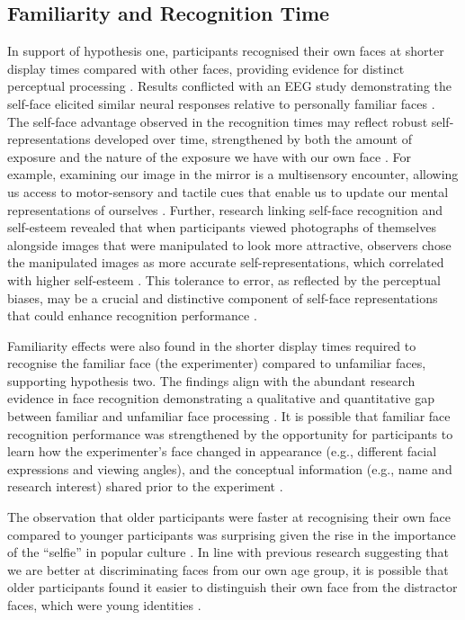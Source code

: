 \documentclass[
  authoryear,
  review,
  3p,
  onecolumn]{elsarticle}
\begin{document}
\subsection{Familiarity and Recognition
Time}\label{familiarity-and-recognition-time}

In support of hypothesis one, participants recognised their own faces at
shorter display times compared with other faces, providing evidence for
distinct perceptual processing \citep{alzueta2019a, rooney2012a}.
Results conflicted with an EEG study demonstrating the self-face
elicited similar neural responses relative to personally familiar faces
\citep{wiese2021a}. The self-face advantage observed in the recognition
times may reflect robust self-representations developed over time,
strengthened by both the amount of exposure and the nature of the
exposure we have with our own face \citep{bortolon2017a, tong1999a}. For
example, examining our image in the mirror is a multisensory encounter,
allowing us access to motor-sensory and tactile cues that enable us to
update our mental representations of ourselves \citep{bortolon2017a}.
Further, research linking self-face recognition and self-esteem revealed
that when participants viewed photographs of themselves alongside images
that were manipulated to look more attractive, observers chose the
manipulated images as more accurate self-representations, which
correlated with higher self-esteem \citep{felisberti2014a}. This
tolerance to error, as reflected by the perceptual biases, may be a
crucial and distinctive component of self-face representations that
could enhance recognition performance \citep{felisberti2014a}.

Familiarity effects were also found in the shorter display times
required to recognise the familiar face (the experimenter) compared to
unfamiliar faces, supporting hypothesis two. The findings align with the
abundant research evidence in face recognition demonstrating a
qualitative and quantitative gap between familiar and unfamiliar face
processing \citep{burton2013a, burton2016a, ramon2017a}. It is possible
that familiar face recognition performance was strengthened by the
opportunity for participants to learn how the experimenter's face
changed in appearance (e.g., different facial expressions and viewing
angles), and the conceptual information (e.g., name and research
interest) shared prior to the experiment \citep{dowsett2016a}.

The observation that older participants were faster at recognising their
own face compared to younger participants was surprising given the rise
in the importance of the ``selfie'' in popular culture
\citep{tshidzumba2019a}. In line with previous research suggesting that
we are better at discriminating faces from our own age group, it is
possible that older participants found it easier to distinguish their
own face from the distractor faces, which were young identities
\citep{rhodes2012a}.
\end{document}
